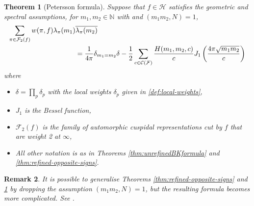 \documentclass{article}
\newtheorem{theorem}{Theorem}[subsection]
\newtheorem{remark}[theorem]{Remark}
\numberwithin{equation}{section}
\begin{document}
\begin{theorem}[Petersson formula]\label{thm:p2-formula}
    Suppose that $f \in \mathcal{H}$ satisfies the geometric and spectral assumptions, for $m_1,m_2 \in \mathbb{N}$ with  and $(m_1m_2,N)=1$,
    \begin{align}
        \sum_{\pi \in \mathcal{F}_2(f)}w(\pi,f)\lambda_\pi(m_1) & \overline{\lambda_\pi(m_2)} \notag \\
        & =\frac{1}{4\pi}\delta_{m_1=m_2}\delta-\frac{1}{2}\sum_{c \in \mathcal{C}(\mathcal{F})}\frac{H(m_1,m_2,c)}{c}J_1\left(\frac{4\pi\sqrt{m_1m_2}}{c}\right)
    \end{align}
    where 
    \begin{itemize}[itemsep=-0.2em]
        \item $\delta=\prod_p\delta_p$ with the local weights $\delta_p$ given in \eqref{def:local-weights},
        \item $J_1$ is the Bessel function,
        \item $\mathcal{F}_2(f)$ is the family of automorphic cuspidal representations cut by $f$ that are weight 2 at $\infty$,
        \item All other notation is as in Theorems \ref{thm:unrefinedBKformula} and \ref{thm:refined-opposite-signs}.
    \end{itemize}
\end{theorem}

\begin{remark}
    It is possible to generalise Theorems \ref{thm:refined-opposite-signs} and \ref{thm:p2-formula} by dropping the assumption $(m_1m_2,N)=1$, but the resulting formula becomes more complicated. See \cite[Remark 4.3]{generalised}.
\end{remark}
\end{document}
